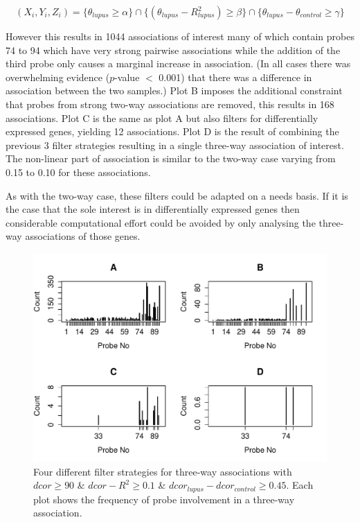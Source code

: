 \documentclass[a4paper, 12pt]{report}
\begin{document}
\[
(X_i, Y_i, Z_i) = \{\theta_{lupus} \ge \alpha \} \cap \{ (\theta_{lupus} - R^2_{lupus}) \ge \beta \} \cap \{ \theta_{lupus} - \theta_{control} \ge \gamma \}
\]

However this results in 1044 associations of interest many of which contain probes 74 to 94 which have very strong pairwise associations while the addition of the third probe only causes a marginal increase in association. (In all cases there was overwhelming evidence ($p$-value $<$ 0.001) that there was a difference in association between the two samples.) Plot B imposes the additional constraint that probes from strong two-way associations are removed, this results in 168 associations. Plot C is the same as plot A but also filters for differentially expressed genes, yielding 12 associations. Plot D is the result of combining the previous 3 filter strategies resulting in a single three-way association of interest. The non-linear part of association is similar to the two-way case varying from 0.15 to 0.10 for these associations. 

As with the two-way case, these filters could be adapted on a needs basis. If it is the case that the sole interest is in differentially expressed genes then considerable computational effort could be avoided by only analysing the three-way associations of those genes.

\begin{figure}[H]
\begin{centering}
\includegraphics[width=15cmh]{3wayFilter.pdf}
\caption{Four different filter strategies for three-way associations with $dcor \ge 90$ \& $dcor - R^2 \ge 0.1$ \& $dcor_{lupus} - dcor_{control} \ge 0.45$. Each plot shows the frequency of probe involvement in a three-way association.} 
\label{F:3wayFilter}
\end{centering}
\end{figure}
\end{document}
